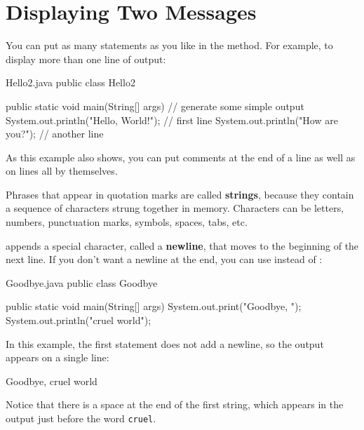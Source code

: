 \section{Displaying Two Messages}

You can put as many statements as you like in the  method.
For example, to display more than one line of output:

\begin{trinket}[250]{Hello2.java}
public class Hello2 {

    public static void main(String[] args) {
        // generate some simple output
        System.out.println("Hello, World!");  // first line
        System.out.println("How are you?");   // another line
    }
}
\end{trinket}

As this example also shows, you can put comments at the end of a line as well as on lines all by themselves.


Phrases that appear in quotation marks are called {\bf strings}, because they contain a sequence of characters strung together in memory.
Characters can be letters, numbers, punctuation marks, symbols, spaces, tabs, etc.


 appends a special character, called a {\bf newline}, that moves to the beginning of the next line.
If you don't want a newline at the end, you can use  instead of :


\begin{trinket}[235]{Goodbye.java}
public class Goodbye {

    public static void main(String[] args) {
        System.out.print("Goodbye, ");
        System.out.println("cruel world");
    }
}
\end{trinket}

\label{goodbye}

In this example, the first statement does not add a newline, so the output appears on a single line:

\begin{stdout}
Goodbye, cruel world
\end{stdout}

Notice that there is a space at the end of the first string, which appears in the output just before the word {\tt cruel}.


